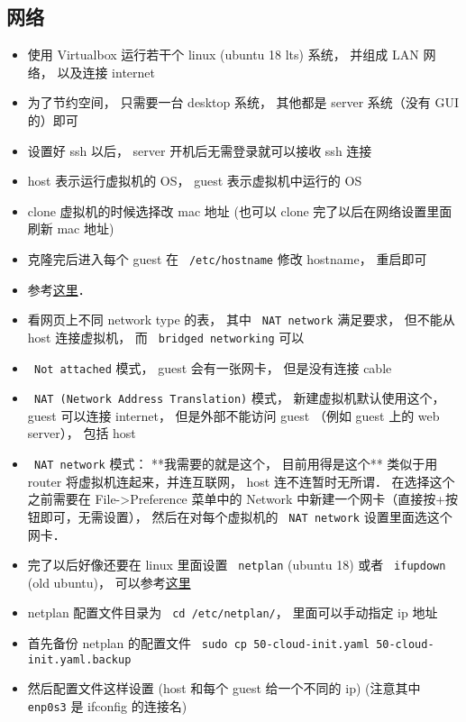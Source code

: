 \subsection{网络}

\begin{itemize}
\item 使用 Virtualbox 运行若干个 linux (ubuntu 18 lts) 系统， 并组成 LAN 网络， 以及连接 internet
\item 为了节约空间， 只需要一台 desktop 系统， 其他都是 server 系统（没有 GUI 的）即可
\item 设置好 ssh 以后， server 开机后无需登录就可以接收 ssh 连接
\item host 表示运行虚拟机的 OS， guest 表示虚拟机中运行的 OS
\item clone 虚拟机的时候选择改 mac 地址 (也可以 clone 完了以后在网络设置里面刷新 mac 地址)
\item 克隆完后进入每个 guest 在 \verb` /etc/hostname` 修改 hostname， 重启即可
\item 参考\href{https://www.thomas-krenn.com/en/wiki/Network_Configuration_in_VirtualBox}{这里}．
\item 看网页上不同 network type 的表， 其中 \verb` NAT network` 满足要求， 但不能从 host 连接虚拟机， 而 \verb` bridged networking` 可以
\item \verb` Not attached` 模式， guest 会有一张网卡， 但是没有连接 cable
\item \verb` NAT (Network Address Translation)` 模式， 新建虚拟机默认使用这个， guest 可以连接 internet， 但是外部不能访问 guest （例如 guest 上的 web server）， 包括 host
\item \verb` NAT network` 模式： **我需要的就是这个， 目前用得是这个** 类似于用 router 将虚拟机连起来，并连互联网， host 连不连暂时无所谓． 在选择这个之前需要在 File->Preference 菜单中的 Network 中新建一个网卡（直接按+按钮即可，无需设置）， 然后在对每个虚拟机的 \verb` NAT network` 设置里面选这个网卡．
\item 完了以后好像还要在 linux 里面设置 \verb` netplan` (ubuntu 18) 或者 \verb` ifupdown` (old ubuntu)， 可以参考\href{https://www.linux.com/tutorials/how-use-netplan-network-configuration-tool-linux/}{这里}
\item netplan 配置文件目录为 \verb` cd /etc/netplan/`， 里面可以手动指定 ip 地址
\item 首先备份 netplan 的配置文件 \verb` sudo cp 50-cloud-init.yaml 50-cloud-init.yaml.backup`
\item 然后配置文件这样设置 (host 和每个 guest 给一个不同的 ip) (注意其中 \verb` enp0s3` 是 ifconfig 的连接名)

\end{itemize}
